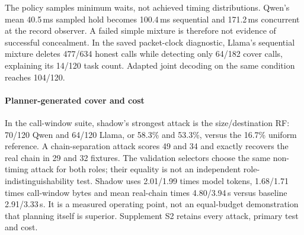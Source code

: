 The policy samples minimum waits, not achieved timing distributions. Qwen's mean 40.5\,ms sampled hold becomes 100.4\,ms sequential and 171.2\,ms concurrent at the record observer. A failed simple mixture is therefore not evidence of successful concealment. In the saved packet-clock diagnostic, Llama's sequential mixture deletes 477/634 honest calls while detecting only 64/182 cover calls, explaining its 14/120 task count. Adapted joint decoding on the same condition reaches 104/120.

\paragraph{Planner-generated cover and cost}
In the call-window suite, shadow's strongest attack is the size/destination RF: 70/120 Qwen and 64/120 Llama, or 58.3\% and 53.3\%, versus the 16.7\% uniform reference. A chain-separation attack scores 49 and 34 and exactly recovers the real chain in 29 and 32 fixtures. The validation selectors choose the same non-timing attack for both roles; their equality is not an independent role-indistinguishability test. Shadow uses 2.01/1.99 times model tokens, 1.68/1.71 times call-window bytes and mean real-chain times 4.80/3.94\,s versus baseline 2.91/3.33\,s. It is a measured operating point, not an equal-budget demonstration that planning itself is superior. Supplement S2 retains every attack, primary test and cost.

